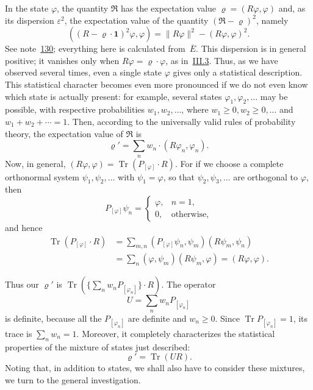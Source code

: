 \documentclass[fontsize=13pt,twoside,openany,headings=normal,parskip=false,bookmarkpackage=false,DIV=calc]{scrbook}
\begin{document}
In the state $\varphi$, the quantity $\mathfrak R$ has the expectation value $\varrho=(R\varphi,\varphi)$ and, as its dispersion $\varepsilon^2$, the expectation value of the quantity $(\mathfrak R-\varrho)^2$, namely
\[
((R-\varrho\cdot\mathbf1)^2\varphi,\varphi)=\|R\varphi\|^2-(R\varphi,\varphi)^2.
\]
See note~\hyperlink{note-130}{130}; everything here is calculated from~\hyperref[eq:IV.1.E]{$\overline E$}. This dispersion is in general positive; it vanishes only when $R\varphi=\varrho\cdot\varphi$, as in~\hyperref[sec:III.3]{III.3}. Thus, as we have observed several times, even a single state $\varphi$ gives only a statistical description. This statistical character becomes even more pronounced if we do not even know which state is actually present: for example, several states $\varphi_1,\varphi_2,\ldots$ may be possible, with respective probabilities $w_1,w_2,\ldots$, where $w_1\geq0,w_2\geq0,\ldots$ and $w_1+w_2+\cdots=1$. Then, according to the universally valid rules of probability theory, the expectation value of $\mathfrak R$ is
\[
\varrho'=\sum_nw_n\cdot(R\varphi_n,\varphi_n).
\]
Now, in general, $(R\varphi,\varphi)=\operatorname{Tr}(P_{[\varphi]}\cdot R)$. For if we choose a complete orthonormal system $\psi_1,\psi_2,\ldots$ with $\psi_1=\varphi$, so that $\psi_2,\psi_3,\ldots$ are orthogonal to $\varphi$, then
\[
P_{[\varphi]}\psi_n=\begin{cases}\varphi,&n=1,\\0,&\text{otherwise},\end{cases}
\]
and hence
\begin{align*}
\operatorname{Tr}(P_{[\varphi]}\cdot R)
&=\sum_{m,n}(P_{[\varphi]}\psi_n,\psi_m)(R\psi_m,\psi_n)\\
&=\sum_n(\varphi,\psi_m)(R\psi_m,\varphi)=(R\varphi,\varphi).
\end{align*}

\hypertarget{origpage-158}{}%
Thus our $\varrho'$ is $\operatorname{Tr}(\{\sum_nw_nP_{[\varphi_n]}\}\cdot R)$. The operator
\[
U=\sum_nw_nP_{[\varphi_n]}
\]
is definite, because all the $P_{[\varphi_n]}$ are definite and $w_n\geq0$. Since $\operatorname{Tr}P_{[\varphi_n]}=1$, its trace is $\sum_nw_n=1$. Moreover, it completely characterizes the statistical properties of the mixture of states just described:
\[
\varrho'=\operatorname{Tr}(UR).
\]
Noting that, in addition to states, we shall also have to consider these mixtures, we turn to the general investigation.
\end{document}
